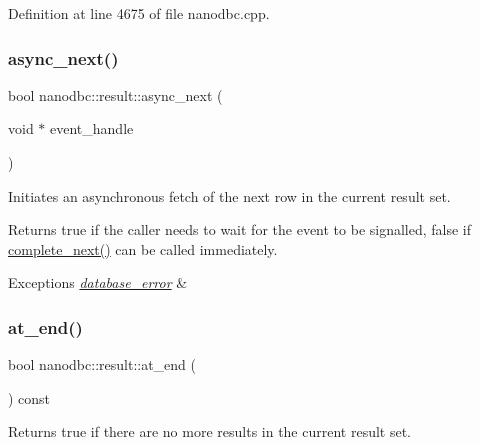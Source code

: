 Definition at line 4675 of file nanodbc.\+cpp.

\mbox{\label{classnanodbc_1_1result_a8c690c95797a04a6ea022e64867d0f53}} 
\subsubsection{\texorpdfstring{async\_next()}{async\_next()}}
{\footnotesize\ttfamily bool nanodbc\+::result\+::async\+\_\+next (\begin{DoxyParamCaption}\item[{void $\ast$}]{event\+\_\+handle }\end{DoxyParamCaption})}



Initiates an asynchronous fetch of the next row in the current result set. 

\begin{DoxyReturn}{Returns}
true if the caller needs to wait for the event to be signalled, false if \mbox{\hyperlink{classnanodbc_1_1result_a0af2da5efc2576da4d2b2b54e340e11c}{complete\+\_\+next()}} can be called immediately. 
\end{DoxyReturn}

\begin{DoxyExceptions}{Exceptions}
{\em \mbox{\hyperlink{classnanodbc_1_1database__error}{database\+\_\+error}}} & \\
\hline
\end{DoxyExceptions}
\mbox{\label{classnanodbc_1_1result_ab6c9e33d74b195c57766dcdd37d101d2}} 
\subsubsection{\texorpdfstring{at\_end()}{at\_end()}}
{\footnotesize\ttfamily bool nanodbc\+::result\+::at\+\_\+end (\begin{DoxyParamCaption}{ }\end{DoxyParamCaption}) const\hspace{0.3cm}{\ttfamily [noexcept]}}



Returns true if there are no more results in the current result set. 



